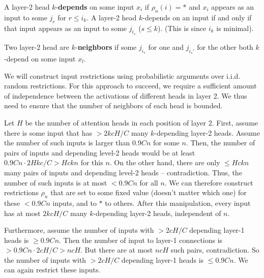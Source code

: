 \documentclass[11pt,a4paper]{article}
\begin{document}
A layer-2 head $k$-\textbf{depends} on some input $x_i$ if $\rho_n(i) = *$ and $x_i$ appears as an input to some $j_r$ for $r \leq i_k$.
A layer-2 head $k$-depends on an input if and only if that input appears as an input to some $j_{i_s}$ ($s \leq k$). (This is since $i_k$ is minimal).

Two layer-2 head are $k$-\textbf{neighbors} if some $j_{i_s}$ for one and $j_{i_s'}$ for the other both $k$-depend on some input $x_l$.



We will construct input restrictions using probabilistic arguments over i.i.d. random restrictions.
For this approach to succeed, we require a  sufficient amount of independence between the activations of different heads in layer 2.
We thus need to ensure that the number of neighbors of each head is bounded.

Let $H$ be the number of attention heads in each position of layer 2.
First, assume there is some input that has $>2kcH/C$ many $k$-depending layer-2 heads.
Assume the number of such inputs is larger than $0.9 Cn$ for some $n$.
Then, the number of pairs of inputs and depending level-2 heads would be at least $0.9 C n \cdot 2H k c/C > Hckn$ for this $n$.
On the other hand, there are only $\leq Hckn$ many pairs of inputs and depending level-2 heads -- contradiction.
Thus, the number of such inputs is at most $<0.9Cn$ for all $n$.
We can therefore construct restrictions $\rho_n$ that are set to some fixed value (doesn't matter which one) for these $<0.9Cn$ inputs, and to $*$ to others.
After this manipulation, every input has at most $2kcH/C$ many $k$-depending layer-2 heads, independent of $n$. 

Furthermore, assume the number of inputs with $> 2cH/C$ depending layer-1 heads is $\geq 0.9Cn$.
Then the number of input to layer-1 connections is $>0.9Cn \cdot 2cH/C > ncH$.
But there are at most $ncH$ such pairs, contradiction.
So the number of inputs with $> 2cH/C$ depending layer-1 heads is $\leq 0.9Cn$.
We can again restrict these inputs.
\end{document}

